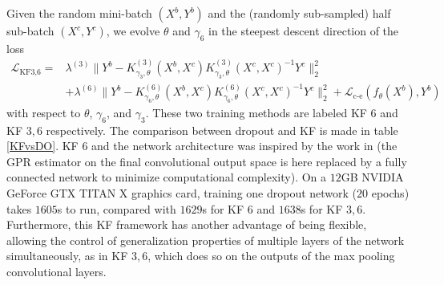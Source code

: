 \documentclass[11pt]{article}
\def\L{\mathcal{L}}
\begin{document}
Given the random mini-batch $(X^b,Y^b)$ and the (randomly sub-sampled) half sub-batch $(X^c,Y^c)$, we evolve $\theta$ and $\gamma_6$ in the steepest descent direction of the loss
{\small
\begin{equation}\label{KFloss2}
\begin{split}
    \L_\text{KF3,6} =& \lambda^{(3)} \|Y^b - K^{(3)}_{\gamma_3,\theta}(X^b,X^c) K^{(3)}_{\gamma_3,\theta}(X^c,X^c)^{-1} Y^c\|_2^2
     \\&+ \lambda^{(6)} \|Y^b - K^{(6)}_{\gamma_6,\theta}(X^b,X^c) K^{(6)}_{\gamma_6,\theta}(X^c,X^c)^{-1} Y^c\|_2^2 + \L_\text{c-e}(f_\theta(X^b), Y^b)
\end{split}
\end{equation}}
with respect to $\theta$, $\gamma_6$, and $\gamma_3$.  These two training methods are labeled KF $6$ and KF $3,6$ respectively.  The comparison between dropout and KF is made in table \ref{KFvsDO}.  KF $6$ and the network architecture was inspired by the work in \cite[Sec. 10]{owhadi2019kernel} (the GPR estimator on the final convolutional output space is here replaced by a fully connected network to minimize computational complexity).  On a $12$GB NVIDIA GeForce GTX TITAN X graphics card, training one dropout network ($20$ epochs) takes $1605$s to run, compared with $1629$s for KF $6$ and $1638$s for KF $3,6$.   Furthermore, this KF framework has another advantage of being flexible, allowing the control of generalization properties of multiple layers of the network simultaneously, as in KF $3, 6$, which does so on the outputs of the max pooling convolutional layers.
\end{document}
